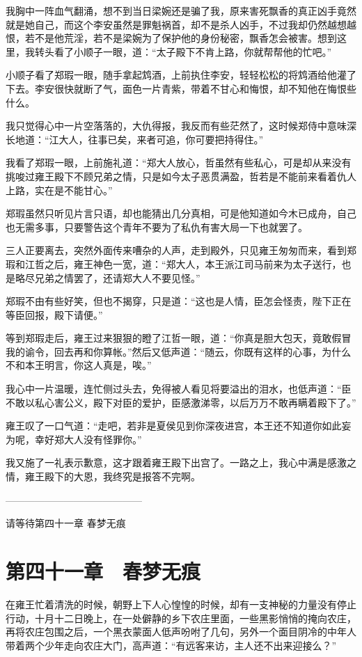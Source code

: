 我胸中一阵血气翻涌，想不到当日梁婉还是骗了我，原来害死飘香的真正凶手竟然就是她自己，而这个李安虽然是罪魁祸首，却不是杀人凶手，不过我却仍然越想越恨，若不是他荒淫，若不是梁婉为了保护他的身份秘密，飘香怎会被害。想到这里，我转头看了小顺子一眼，道：“太子殿下不肯上路，你就帮帮他的忙吧。”

小顺子看了郑瑕一眼，随手拿起鸩酒，上前执住李安，轻轻松松的将鸩酒给他灌了下去。李安很快就断了气，面色一片青紫，带着不甘心和悔恨，却不知他在悔恨些什么。

我只觉得心中一片空落落的，大仇得报，我反而有些茫然了，这时候郑侍中意味深长地道：“江大人，往事已矣，来者可追，你可要把持得住。”

我看了郑瑕一眼，上前施礼道：“郑大人放心，哲虽然有些私心，可是却从来没有挑唆过雍王殿下不顾兄弟之情，只是如今太子恶贯满盈，哲若是不能前来看着仇人上路，实在是不能甘心。”

郑瑕虽然只听见片言只语，却也能猜出几分真相，可是他知道如今木已成舟，自己也无需多事，只要警告这个青年不要为了私仇有害大局一下也就罢了。

三人正要离去，突然外面传来嘈杂的人声，走到殿外，只见雍王匆匆而来，看到郑瑕和江哲之后，雍王神色一宽，道：“郑大人，本王派江司马前来为太子送行，也是略尽兄弟之情罢了，还请郑大人不要见怪。”

郑瑕不由有些好笑，但也不揭穿，只是道：“这也是人情，臣怎会怪责，陛下正在等臣回报，殿下请便。”

等到郑瑕走后，雍王过来狠狠的瞪了江哲一眼，道：“你真是胆大包天，竟敢假冒我的谕令，回去再和你算帐。”然后又低声道：“随云，你既有这样的心事，为什么不和本王明言，你这人真是，唉。”

我心中一片温暖，连忙侧过头去，免得被人看见将要溢出的泪水，也低声道：“臣不敢以私心害公义，殿下对臣的爱护，臣感激涕零，以后万万不敢再瞒着殿下了。”

雍王叹了一口气道：“走吧，若非是夏侯见到你深夜进宫，本王还不知道你如此妄为呢，幸好郑大人没有怪罪你。”

我又施了一礼表示歉意，这才跟着雍王殿下出宫了。一路之上，我心中满是感激之情，雍王殿下的大恩，我终究是报答不完啊。

——————————————

请等待第四十一章 春梦无痕

\chapter{第四十一章　春梦无痕}

在雍王忙着清洗的时候，朝野上下人心惶惶的时候，却有一支神秘的力量没有停止行动，十月十二日晚上，在一处僻静的乡下农庄里面，一些黑影悄悄的掩向农庄，再将农庄包围之后，一个黑衣蒙面人低声吩咐了几句，另外一个面目阴冷的中年人带着两个少年走向农庄大门，高声道：“有远客来访，主人还不出来迎接么？”

